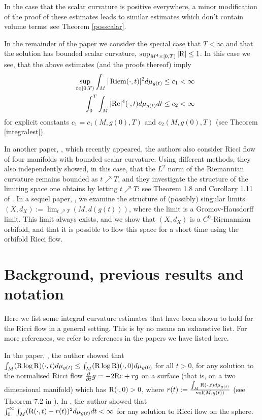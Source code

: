 \documentclass{amsart}
\numberwithin{equation}{section}
\theoremstyle{definition}
\theoremstyle{remark}
\begin{document}
In the case that the scalar curvature is positive everywhere,
a minor modification of the proof of these estimates leads to
similar estimates which don't contain volume terms: see Theorem \ref{posscalar}.

In the remainder of the paper we consider the special case that $T< \infty$
and that the solution has bounded scalar curvature, $\sup_{M^4\times
  [0,T)} |{{\rm R}}|\leq 1$. In this case we see, that the above estimates
(and the proofs thereof) imply
\begin{eqnarray}
&&\sup_{ t\in [0,T)} \int_M |\operatorname{Riem}(\cdot,t)|^2 d\mu_{g(t)} \leq c_1 < \infty \cr
&&\int_0^T\int_M |{{\rm{Rc}}}|^4(\cdot,t)d\mu_{g(t)} dt\leq c_2 < \infty
\end{eqnarray}
for explicit  constants $c_1=c_1(M,g(0),T)$ and $c_2(M,g(0),T)$  (see Theorem \ref{integralest}). 

In another paper, \cite{BZ}, which recently appeared, the authors 
also consider Ricci flow of four manifolds with bounded scalar curvature.
Using different methods, they also independently showed, in this case, that the $L^2$ norm of the
Riemannian curvature  remains bounded as $t {\nearrow} T$, and they investigate the structure
of the limiting space one obtains by letting  $t {\nearrow}
T$: see Theorem 1.8 and Corollary 1.11 of \cite{BZ}.
In a sequel paper, \cite{Si}, we examine the structure of (possibly) singular limits $(X,d_X) := \lim_{t {\nearrow} T}
(M,d(g(t)))$, where the limit is a Gromov-Hausdorff limit. This limit
always exists, and we show that $(X,d_X)$ is a $C^0$-Riemannian orbifold, and that it is
possible to flow this space for a short time using the orbifold Ricci flow.

\section{Background, previous results and notation}
Here we list some integral curvature estimates that have been shown to
hold for the Ricci flow in a general setting. This is by no means an exhaustive list.
For more references, we refer to references in the papers we have
listed here.

In the paper, \cite{HaSurface},  the author showed that\\
$\int_M ({{\rm R}}  \log{{\rm R}})(\cdot,t) d\mu_{g(t)}  \leq  \int_M ({{\rm R}}
\log{{\rm R}})(\cdot,0) d\mu_{g(0)}$ for all $t>0$, 
for any solution to the normalised Ricci flow ${\frac{\partial }{\partial t} } g = -2{{\rm{Rc}}}  + rg$
on a surface (that is, on a two dimensional manifold) which has ${{\rm R}}(\cdot,0) >0$, where $r(t):= \frac{\int_M
  {{\rm R}}(\cdot,t) d\mu_{g(t)}}{\operatorname{vol}(M,g(t))}$ (see Theorem 7.2 in \cite{HaSurface}).
In \cite{ChowI}, the author showed that\\
 $\int_0^{\infty} \int_M ({{\rm R}}(\cdot,t) -r(t))^2
d\mu_{g(t)} dt < \infty$ for any solution to Ricci flow on the sphere.
\end{document}
